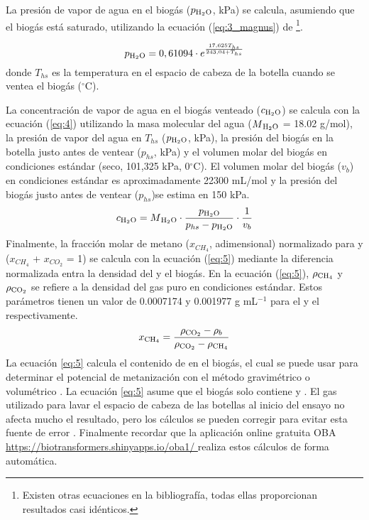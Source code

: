 \documentclass[spanish]{article}
\begin{document}
La presión de vapor de agua en el biogás ($p\textsubscript{H$_2$O}$, kPa) se calcula, asumiendo que el biogás está saturado, utilizando la ecuación (\ref{eq:3_magnus}) de \citet{alduchovImprovedMagnusForm1996}\footnote{
  Existen otras ecuaciones en la bibliografía, todas ellas proporcionan resultados casi idénticos.
}.

\begin{equation}
  \label{eq:3_magnus}
  p\textsubscript{H$_2$O} = 0,61094 \cdot e^{\frac{17,625 T_{hs}}{243,04 + T_{hs}}}
\end{equation}
donde $T_{hs}$ es la temperatura en el espacio de cabeza de la botella cuando se ventea el biogás ($^\circ$C). 

La concentración de vapor de agua en el biogás venteado ($c\textsubscript{H$_2$O}$) se calcula con la ecuación (\ref{eq:4}) utilizando la masa molecular del agua ($M\textsubscript{H$_2$O}$ = 18.02 g/mol), la presión de vapor del agua en $T_{hs}$ ($p\textsubscript{H$_2$O}$, kPa), la presión del biogás en la botella justo antes de ventear ($p_{hs}$, kPa) y el volumen molar del biogás en condiciones estándar (seco, 101,325 kPa, 0$^\circ$C). El volumen molar del biogás ($v_b$) en condiciones estándar es aproximadamente 22300 mL/mol \citep{hafnerValidationSimpleGravimetric2015} y la presión del biogás justo antes de ventear ($p_{hs}$)se estima en 150 kPa.
\begin{equation}
  \label{eq:4}
  c\textsubscript{H$_2$O}=M\textsubscript{H$_2$O} \cdot \frac{p\textsubscript{H$_2$O}}{p_{hs}-p\textsubscript{H$_2$O}} \cdot \frac{1}{v_b}
\end{equation}
Finalmente, la fracción molar de  metano ($x_{CH_4}$, adimensional) normalizado para  y  ($x_{CH_4}$ + $x_{CO_2}$ = 1) se calcula con la ecuación (\ref{eq:5})  mediante la diferencia normalizada entra la densidad del  y el biogás. En la ecuación (\ref{eq:5}), $\rho\textsubscript{CH$_4$}$ y $\rho\textsubscript{CO$_2$}$ se refiere a la densidad del gas puro en condiciones estándar. Estos parámetros tienen un valor de 0.0007174 y 0.001977 g mL$^{-1}$ para el  y el  respectivamente.
\begin{equation}
  \label{eq:5}
  x\textsubscript{CH$_4$}=\frac{\rho\textsubscript{CO$_2$} - \rho_b}{\rho\textsubscript{CO$_2$}-\rho\textsubscript{CH$_4$}}
\end{equation}
La ecuación \ref{eq:5} calcula el contenido de  en el biogás, el cual se puede usar para determinar el potencial de metanización con el método gravimétrico o volumétrico \citep{hafnerValidationSimpleGravimetric2015}. La ecuación \ref{eq:5} asume que el biogás solo contiene  y . El gas utilizado para lavar el espacio de cabeza de las botellas al inicio del ensayo no afecta mucho el resultado, pero los cálculos se pueden corregir para evitar esta fuente de error \citep{justesenDevelopmentValidationLowcost2019}.
Finalmente recordar que la aplicación online gratuita OBA \url{ https://biotransformers.shinyapps.io/oba1/ } realiza estos cálculos de forma automática.
\end{document}
